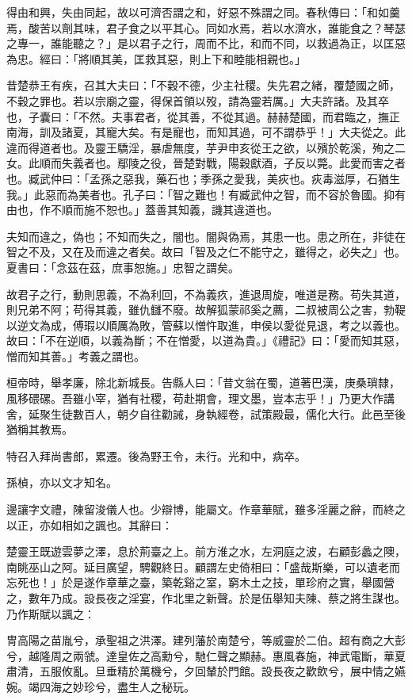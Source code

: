 \begin{pinyinscope}
得由和興，失由同起，故以可濟否謂之和，好惡不殊謂之同。春秋傳曰：「和如羹焉，酸苦以劑其味，君子食之以平其心。同如水焉，若以水濟水，誰能食之？琴瑟之專一，誰能聽之？」是以君子之行，周而不比，和而不同，以救過為正，以匡惡為忠。經曰：「將順其美，匡救其惡，則上下和睦能相親也。」

昔楚恭王有疾，召其大夫曰：「不穀不德，少主社稷。失先君之緒，覆楚國之師，不穀之罪也。若以宗廟之靈，得保首領以歿，請為靈若厲。」大夫許諸。及其卒也，子囊曰：「不然。夫事君者，從其善，不從其過。赫赫楚國，而君臨之，撫正南海，訓及諸夏，其寵大矣。有是寵也，而知其過，可不謂恭乎！」大夫從之。此違而得道者也。及靈王驕淫，暴虐無度，芋尹申亥從王之欲，以殯於乾溪，殉之二女。此順而失義者也。鄢陵之役，晉楚對戰，陽穀獻酒，子反以斃。此愛而害之者也。臧武仲曰：「孟孫之惡我，藥石也；季孫之愛我，美疢也。疢毒滋厚，石猶生我。」此惡而為美者也。孔子曰：「智之難也！有臧武仲之智，而不容於魯國。抑有由也，作不順而施不恕也。」蓋善其知義，譏其違道也。

夫知而違之，偽也；不知而失之，闇也。闇與偽焉，其患一也。患之所在，非徒在智之不及，又在及而違之者矣。故曰「智及之仁不能守之，雖得之，必失之」也。夏書曰：「念茲在茲，庶事恕施。」忠智之謂矣。

故君子之行，動則思義，不為利回，不為義疚，進退周旋，唯道是務。苟失其道，則兄弟不阿；苟得其義，雖仇讎不廢。故解狐蒙祁奚之薦，二叔被周公之害，勃鞮以逆文為成，傅瑕以順厲為敗，管蘇以憎忤取進，申侯以愛從見退，考之以義也。故曰：「不在逆順，以義為斷；不在憎愛，以道為貴。」《禮記》曰：「愛而知其惡，憎而知其善。」考義之謂也。

桓帝時，舉孝廉，除北新城長。告縣人曰：「昔文翁在蜀，道著巴漢，庚桑瑣隸，風移碨磥。吾雖小宰，猶有社稷，苟赴期會，理文墨，豈本志乎！」乃更大作講舍，延聚生徒數百人，朝夕自往勸誡，身執經卷，試策殿最，儒化大行。此邑至後猶稱其教焉。

特召入拜尚書郎，累遷。後為野王令，未行。光和中，病卒。

孫楨，亦以文才知名。

邊讓字文禮，陳留浚儀人也。少辯博，能屬文。作章華賦，雖多淫麗之辭，而終之以正，亦如相如之諷也。其辭曰：

楚靈王既遊雲夢之澤，息於荊臺之上。前方淮之水，左洞庭之波，右顧彭蠡之隩，南眺巫山之阿。延目廣望，騁觀終日。顧謂左史倚相曰：「盛哉斯樂，可以遺老而忘死也！」於是遂作章華之臺，築乾谿之室，窮木土之技，單珍府之實，舉國營之，數年乃成。設長夜之淫宴，作北里之新聲。於是伍舉知夫陳、蔡之將生謀也。乃作斯賦以諷之：

冑高陽之苗胤兮，承聖祖之洪澤。建列藩於南楚兮，等威靈於二伯。超有商之大彭兮，越隆周之兩虢。達皇佐之高勳兮，馳仁聲之顯赫。惠風春施，神武電斷，華夏肅清，五服攸亂。旦垂精於萬機兮，夕回輦於門館。設長夜之歡飲兮，展中情之嬿婉。竭四海之妙珍兮，盡生人之秘玩。


\end{pinyinscope}
